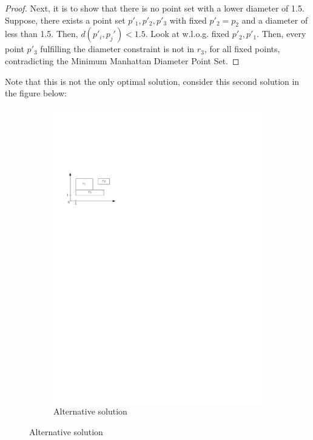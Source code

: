 \documentclass[a4paper,12pt,headsepline]{scrartcl}
\begin{document}
\begin{enumerate}[a)]
\begin{proof}
	Next, it is to show that there is no point set with a lower diameter of 1.5. Suppose, there exists a point set $p'_1,p'_2, p'_3$ with fixed $p'_2 = p_2$ and a diameter of less than 1.5. Then, $d(p'_i,p_j') < 1.5$. Look at w.l.o.g. fixed $p'_2, p'_1$. Then, every point $p'_3$ fulfilling the diameter constraint is not in $r_3$, for all fixed points, contradicting the Minimum Manhattan Diameter Point Set.
\end{proof}
Note that this is not the only optimal solution, consider this second solution in the figure below:
	\begin{figure}[H]
	\centering
	\begin{subfigure}{0.48\textwidth}
		\centering
		\includegraphics[width=1\linewidth,page=3]{graphics/7_2.pdf}
		\caption*{Alternative solution}
	\end{subfigure}
\end{figure}

\end{enumerate}
\end{document}
